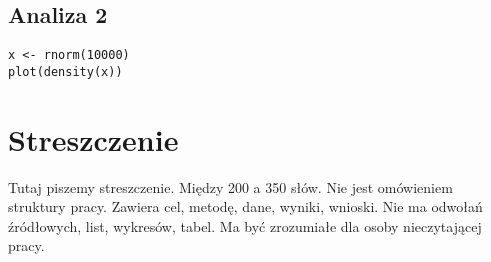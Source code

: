 \documentclass[12pt,a4paper,twoside,openany]{book}
\begin{document}
\section*{Analiza 2}
\begin{verbatim}
x <- rnorm(10000)
plot(density(x))
\end{verbatim}

\clearpage

\chapter*{Streszczenie}

Tutaj piszemy streszczenie. Między 200 a 350 słów. Nie jest omówieniem struktury pracy. Zawiera cel, metodę, dane, wyniki, wnioski. Nie ma odwołań źródłowych, list, wykresów, tabel. Ma być zrozumiałe dla osoby nieczytającej pracy.
\end{document}
